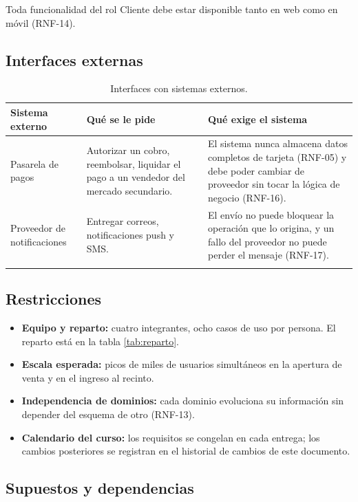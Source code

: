 \documentclass[11pt,a4paper]{article}
\begin{document}
Toda funcionalidad del rol Cliente debe estar disponible tanto en web como en móvil (RNF-14).

\subsection{Interfaces externas}
\label{sec:externas}

\begin{center}
\begin{longtable}{P{3.4cm}P{4.6cm}P{6.5cm}}
\toprule
\textbf{Sistema externo} & \textbf{Qué se le pide} & \textbf{Qué exige el sistema}\\
\midrule
\endhead
Pasarela de pagos & Autorizar un cobro, reembolsar, liquidar el pago a un vendedor del mercado
secundario. & El sistema nunca almacena datos completos de tarjeta (RNF-05) y debe poder cambiar de
proveedor sin tocar la lógica de negocio (RNF-16).\\[0.3em]
Proveedor de notificaciones & Entregar correos, notificaciones push y SMS. & El envío no puede
bloquear la operación que lo origina, y un fallo del proveedor no puede perder el mensaje
(RNF-17).\\
\bottomrule
\caption{Interfaces con sistemas externos.}
\label{tab:externas}
\end{longtable}
\end{center}

\subsection{Restricciones}

\begin{itemize}
  \item \textbf{Equipo y reparto:} cuatro integrantes, ocho casos de uso por persona. El reparto
        está en la tabla \ref{tab:reparto}.
  \item \textbf{Escala esperada:} picos de miles de usuarios simultáneos en la apertura de venta y
        en el ingreso al recinto.
  \item \textbf{Independencia de dominios:} cada dominio evoluciona su información sin depender del
        esquema de otro (RNF-13).
  \item \textbf{Calendario del curso:} los requisitos se congelan en cada entrega; los cambios
        posteriores se registran en el historial de cambios de este documento.
\end{itemize}

\subsection{Supuestos y dependencias}
\end{document}
